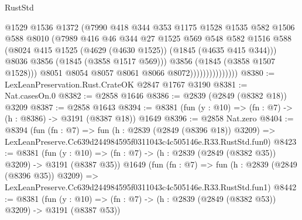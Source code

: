 \begin{lexlean}{RustStd}
\begin{coremodule}
                                  @1529
                                  @1536
                                  @1372
                                  (@7990
                                    @418
                                    @344
                                    @353
                                    @1175
                                    @1528
                                    @1535
                                    @582
                                    @1506
                                    @588
                                    @8010
                                    (@7989
                                      @416
                                      @46
                                      @344
                                      @27
                                      @1525
                                      @569
                                      @548
                                      @582
                                      @1516
                                      @588
                                      (@8024
                                        @415
                                        @1525
                                        (@4629 (@4630 @1525))
                                        (@1845 (@4635 @415 @344)))
                                      @8036
                                      @3856
                                      (@1845 (@3858 @1517 @569)))
                                    @3856
                                    (@1845 (@3858 @1507 @1528)))
                                  @8051
                                  @8054
                                  @8057
                                  @8061
                                  @8066
                                  @8072)))))))))))))))
@8380 := LexLeanPreservation.Rust.CrateOK @2847 @1767 @3190
@8381 := Nat.casesOn.{0}
@8382 := @2858 @1646
@8386 := @2839 (@2849 (@8382 @18)) @3209
@8387 := @2858 @1643
@8394 := @8381 (fun (y : @10) => (fn : @7) -> (h : @8386) -> @3191 (@8387 @18)) @1649
@8396 := @2858 Nat.zero
@8404 := @8394
    (fun (fn : @7) =>
    fun (h : @2839 (@2849 (@8396 @18)) @3209) =>
    LexLeanPreserve.Cc639d244984595f0311043c4c505146e.R33.RustStd.fun0)
@8423 := @8381
    (fun (y : @10) => (fn : @7) -> (h : @2839 (@2849 (@8382 @35)) @3209) -> @3191 (@8387 @35))
    @1649
    (fun (fn : @7) =>
    fun (h : @2839 (@2849 (@8396 @35)) @3209) =>
    LexLeanPreserve.Cc639d244984595f0311043c4c505146e.R33.RustStd.fun1)
@8442 := @8381
    (fun (y : @10) => (fn : @7) -> (h : @2839 (@2849 (@8382 @53)) @3209) -> @3191 (@8387 @53))

\end{coremodule}
\end{lexlean}
